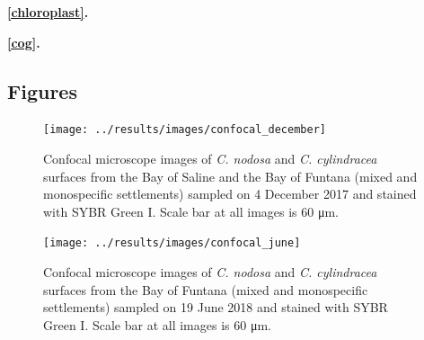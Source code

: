 \documentclass[12pt,]{article}
\begin{document}
\textbf{\autoref{chloroplast}.} 

\textbf{\autoref{cog}.} 

\newpage

\hypertarget{figures}{%
\subsection{Figures}\label{figures}}

\begin{figure}[ht]

{\centering \texttt{[image: ../results/images/confocal\_december]} 

}

\caption{Confocal microscope images of \textit{C. nodosa} and \textit{C. cylindracea} surfaces from the Bay of Saline and the Bay of Funtana (mixed and monospecific settlements) sampled on 4 December 2017 and stained with SYBR Green I. Scale bar at all images is 60 \si{\um}.\label{confocal_december}}\label{fig:unnamed-chunk-1}
\end{figure}

\newpage
\begin{figure}[ht]

{\centering \texttt{[image: ../results/images/confocal\_june]} 

}

\caption{Confocal microscope images of \textit{C. nodosa} and \textit{C. cylindracea} surfaces from the Bay of Funtana (mixed and monospecific settlements) sampled on 19 June 2018 and stained with SYBR Green I. Scale bar at all images is 60 \si{\um}.\label{confocal_june}}\label{fig:unnamed-chunk-2}
\end{figure}
\end{document}
